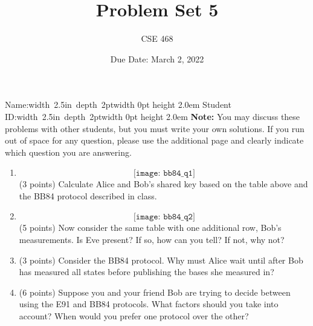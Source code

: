 \documentclass[12pt]{article}
\title{Problem Set 5}
\author{CSE 468}
\date{Due Date: March 2, 2022}
\newcommand{\NameBlank}{\mbox{\hskip 4pt\vrule width 2.5in depth 2pt}\vrule width 0pt height 2.0em}
\begin{document}
\maketitle

\noindent Name:\NameBlank{} \newline
\noindent Student ID:\NameBlank{} \newline
\textbf{Note:} You may discuss these problems with other students, but you must write your own solutions. If you run out of space for any question, please use the additional page and clearly indicate which question you are answering.

\begin{enumerate}[font=\bfseries]
    \item \[\texttt{[image: bb84\_q1]}\]
    (3 points) Calculate Alice and Bob's shared key based on the table above and the BB84 protocol described in class.
    \item \[\texttt{[image: bb84\_q2]}\]
    (5 points) Now consider the same table with one additional row, Bob's measurements. Is Eve present? If so, how can you tell? If not, why not?
    \item (3 points) Consider the BB84 protocol. Why must Alice wait until after Bob has measured all states before publishing the bases she measured in?
    \item (6 points) Suppose you and your friend Bob are trying to decide between using the E91 and BB84 protocols. What factors should you take into account? When would you prefer one protocol over the other?

\end{enumerate}
\end{document}
